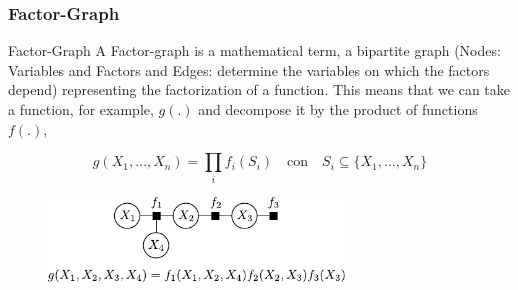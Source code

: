     \begin{frame}
    \frametitle{Factor-Graph}
    
    \begin{block}{Factor-Graph}
    A Factor-graph is a mathematical term, a bipartite graph (Nodes: Variables and Factors and Edges: determine the variables on which the factors depend) representing the factorization of a function. This means that we can take a function, for example, $g(.)$ and decompose it by the product of functions $f(.)$,
    
    \begin{equation*}
    g(X_{1}, \dots, X_{n}) = \prod_{i} f_{i}(S_{i}) \quad \text{con} \quad S_{i} \subseteq \{ X_{1},\dots, X_{n} \}
    \end{equation*}
    \end{block}
    
    \begin{figure}[!h]
    \includegraphics[width=0.7\textwidth]{images/factor_graph_example.pdf}
    \end{figure}
    
    
    \end{frame}
    
